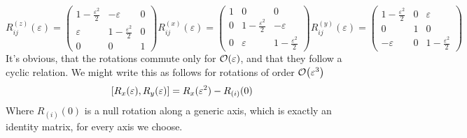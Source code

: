 \documentclass[../qm.tex]{subfiles}
\begin{document}
	\begin{subequations}
	\begin{equation}
		R_{ij}^{(z)}(\varepsilon)=\begin{pmatrix}
			1-\frac{\varepsilon^2}{2}&-\varepsilon&0\\
			\varepsilon&1-\frac{\varepsilon^2}{2}&0\\
			0&0&1
		\end{pmatrix}
		\label{eq:infrotmatrixz}
	\end{equation}
	\begin{equation}
		R_{ij}^{(x)}(\varepsilon)=\begin{pmatrix}
			1&0&0\\
			0&1-\frac{\varepsilon^2}{2}&-\varepsilon\\
			0&\varepsilon&1-\frac{\varepsilon^2}{2}
		\end{pmatrix}
		\label{eq:infrotmatrixx}
	\end{equation}
	\begin{equation}
		R_{ij}^{(y)}(\varepsilon)=\begin{pmatrix}
			1-\frac{\varepsilon^2}{2}&0&\varepsilon\\
			0&1&0\\
			-\varepsilon&0&1-\frac{\varepsilon^2}{2}
		\end{pmatrix}
		\label{eq:infrotmatrixy}
	\end{equation}
\end{subequations}
	It's obvious, that the rotations commute only for $\order{\varepsilon}$, and that they follow a cyclic relation. We might write this as follows for rotations of order $\order{\varepsilon^3}$\\
	\begin{equation}
		\comm{R_x(\varepsilon)}{R_y(\varepsilon)}=R_x(\varepsilon^2)-R_{(i)}(0)
		\label{eq:rotationcommutationrel}
	\end{equation}
	Where $R_{(i)}(0)$ is a null rotation along a generic axis, which is exactly an identity matrix, for every axis we choose.
\end{document}

